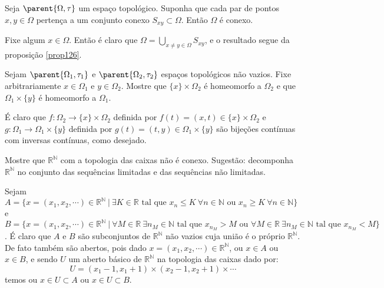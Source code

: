 \begin{Mybox}
Seja $\parent{\Omega, \tau}$ um espaço topológico. Suponha que cada par de pontos $x, y \in \Omega$ pertença a um conjunto conexo $S_{xy} \subset \Omega$. Então $\Omega$ é conexo.
\vspace{-.4cm}
\end{Mybox}
\vspace{-.5cm}
\begin{dem}
 Fixe algum $x \in \Omega$. Então é claro que $\Omega = \displaystyle{\bigcup_{x \neq y \in \Omega} S_{xy}}$, e o resultado segue da proposição \cref{prop126}.
\end{dem}

\begin{Mybox}
Sejam $\parent{\Omega_1, \tau_1}$ e $\parent{\Omega_2, \tau_2}$ espaços topológicos não vazios. Fixe arbitrariamente $x \in \Omega_1$ e $y \in \Omega_2$. Mostre que $\{x\} \times \Omega_2$ é homeomorfo a $\Omega_2$ e que $\Omega_1 \times \{y \}$ é homeomorfo a $\Omega_1$.
\vspace{-.4cm}
\end{Mybox}
\vspace{-.5cm}
\begin{dem}
É claro que $f: \Omega_2 \to \{x\} \times \Omega_2$ definida por $f(t) = (x, t) \in \{x\} \times \Omega_2$ e $g: \Omega_1 \to \Omega_1 \times \{y\}$ definida por $g(t) = (t, y) \in \Omega_1 \times \{y\}$ são bijeções contínuas com inversas contínuas, como desejado.
\end{dem}

\begin{Mybox}
Mostre que $\mathbb{R}^{\mathbb{N}}$ com a topologia das caixas não é conexo. Sugestão: decomponha $\mathbb{R}^{\mathbb{N}}$ no conjunto das sequências limitadas e das sequências não limitadas.
\vspace{-.4cm}
\end{Mybox}
\vspace{-.5cm}
\begin{dem}
Sejam $A = \{x = (x_1, x_2, \cdots) \in \mathbb{R}^{\mathbb{N}} \ \vert \ \exists K \in \mathbb{R} \text{ tal que } x_n \leq K \ \forall n \in \mathbb{N} \text{ ou } x_n \geq K \ \forall n \in \mathbb{N}\}$ e $B = \{x = (x_1, x_2, \cdots) \in \mathbb{R}^{\mathbb{N}} \ \vert \ \forall M \in \mathbb{R} \ \exists n_M \in \mathbb{N} \text{ tal que } x_{n_M} > M \text{ ou } \forall M \in \mathbb{R} \ \exists n_M \in \mathbb{N} \text{ tal que } x_{n_M} < M\}$. É claro que $A$ e $B$ são subconjuntos de $\mathbb{R}^{\mathbb{N}}$ não vazios cuja união é o próprio $\mathbb{R}^{\mathbb{N}}$. De fato também são abertos, pois dado $x = (x_1, x_2, \cdots) \in \mathbb{R}^{\mathbb{N}}$, ou $x \in A$ ou $x \in B$, e sendo $U$ um aberto básico de $\mathbb{R}^{\mathbb{N}}$ na topologia das caixas dado por:
    $$U = (x_1 - 1, x_1 + 1) \times (x_2 - 1, x_2 + 1) \times \cdots$$
    temos ou $x \in U \subset A$ ou $x \in U \subset B$.
\end{dem}

